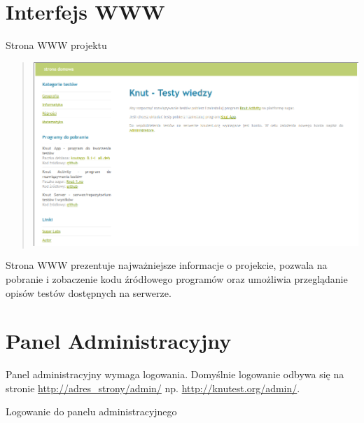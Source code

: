 \documentclass[letterpaper,10pt,polish]{sphinxmanual}
\begin{document}
\section{Interfejs WWW}
\label{index:id5}\label{index:interfejs-www}
Strona WWW projektu
\begin{quote}

\includegraphics{StronaGlowna.png}
\end{quote}

Strona WWW prezentuje najważniejsze informacje o projekcie, pozwala na pobranie i zobaczenie kodu źródłowego programów oraz umożliwia przeglądanie opisów testów dostępnych na serwerze.


\section{Panel Administracyjny}
\label{index:id6}\label{index:panel-administracyjny}
Panel administracyjny wymaga logowania. Domyślnie logowanie odbywa się na stronie \href{http://adres\_strony/admin/}{http://adres\_strony/admin/} np. \href{http://knutest.org/admin/}{http://knutest.org/admin/}.

Logowanie do panelu administracyjnego

\end{document}
